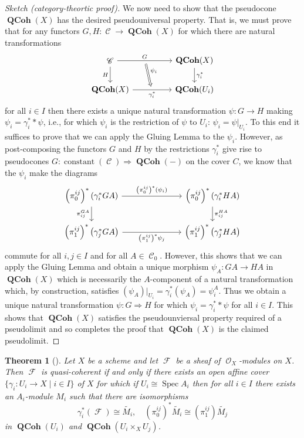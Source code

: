 \documentclass{amsart}
\newtheorem{Theorem}[equation]{Theorem}
\theoremstyle{definition}
\DeclareMathOperator{\Cscr}{\mathscr{C}}
\DeclareMathOperator{\Fscr}{\mathscr{F}}
\DeclareMathOperator{\Ocal}{\mathcal{O}}
\DeclareMathOperator{\Spec}{Spec}
\DeclareMathOperator{\QCoh}{\mathbf{QCoh}}
\numberwithin{equation}{subsection}
\begin{document}
\begin{proof}[Sketch (category-theortic proof)]
	We now need to show that the pseudocone $\QCoh(X)$ has the desired pseudouniversal property. That is, we must prove that for any functors $G, H:\Cscr \to \QCoh(X)$ for which there are natural transformations
	\[
	\begin{tikzcd}
		\Cscr \ar[rr, ""{name = U}]{}{G} \ar[d, swap]{}{H} & & \QCoh(X) \ar[d]{}{\gamma_i^{\ast}} \\
		\QCoh(X) \ar[rr, swap, ""{name = D}]{}{\gamma_i^{\ast}} & & \QCoh(U_i)
		\ar[from = U, to = D, Rightarrow, shorten <= 4pt, shorten >= 4pt]{}{\psi_i}
	\end{tikzcd}
	\]
	for all $i \in I$ then there exists a unique natural transformation $\psi:G \to H$ making $\psi_i = \gamma_i^{\ast} \ast \psi$, i.e., for which $\psi_i$ is the restriction of $\psi$ to $U_i$: $\psi_i = \psi|_{U_i}$. To this end it suffices to prove that we can apply the Gluing Lemma to the $\psi_i$. However, as post-composing the functors $G$ and $H$ by the restrictions $\gamma_i^{\ast}$ give rise to pseudocones $G:\operatorname{constant}(\Cscr) \Rightarrow \QCoh(-)$ on the cover $C$, we know that the $\psi_i$ make the diagrams
	\[
	\begin{tikzcd}
		\left(\pi_0^{ij}\right)^{\ast}\left(\gamma_i^{\ast}GA\right) \ar[rrr]{}{\left(\pi_0^{ij}\right)^{\ast}(\psi_i)} \ar[d, swap]{}{\pi_{ij}^{GA}} & & & \left(\pi_0^{ij}\right)^{\ast}\left(\gamma_i^{\ast}HA\right) \ar[d]{}{\pi_{ij}^{HA}} \\
		\left(\pi_1^{ij}\right)^{\ast}\left(\gamma_j^{\ast}GA\right) \ar[rrr, swap]{}{\left(\pi_{1}^{ij}\right)^{\ast}\psi_j} & & & \left(\pi_1^{ij}\right)^{\ast}\left(\gamma_j^{\ast}HA\right) 
	\end{tikzcd}
	\]
	commute for all $i, j \in I$ and for all $A \in \Cscr_0$. However, this shows that we can apply the Gluing Lemma and obtain a unique morphism $\psi_A:GA \to HA$ in $\QCoh(X)$ which is necessarily the $A$-component of a natural transformation which, by construction, satisfies $(\psi_A)|_{U_i} = \gamma_i^{\ast}(\psi_A) = \psi_i^{A}$. Thus we obtain a unique natural transformation $\psi:G \Rightarrow H$ for which $\psi_i = \gamma_i^{\ast} \ast \psi$ for all $i \in I$. This shows that $\QCoh(X)$ satisfies the pseudounviersal property required of a pseudolimit and so completes the proof that $\QCoh(X)$ is the claimed pseudolimit.
\end{proof}
\begin{Theorem}[{\cite[Tag 01BK]{stacks-project}}]\label{Thm: Section Background Scheme: Checking QCoh affine locally}
	Let $X$ be a scheme and let $\Fscr$ be a sheaf of $\Ocal_X$-modules on $X$. Then $\Fscr$ is quasi-coherent if and only if there exists an open affine cover $\lbrace \gamma_i:U_i  \to X \; | \; i \in I \rbrace$ of $X$ for which if $U_i \cong \Spec A_i$ then for all $i \in I$ there exists an $A_i$-module $M_i$ such that there are isomorphisms
	\[
	\gamma_i^{\ast}\left(\Fscr\right) \cong \widetilde{M_i}, \quad \left(\pi_0^{ij}\right)^{\ast}\widetilde{M_i} \cong \left(\pi_1^{ij}\right)\widetilde{M_j}
	\]
	in $\QCoh(U_i)$ and $\QCoh(U_i \times_X U_j)$.
\end{Theorem}
\end{document}
